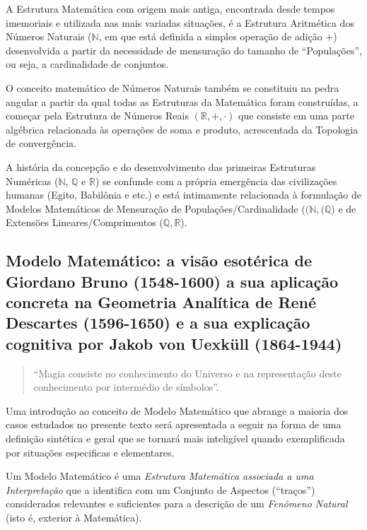     A Estrutura Matemática com origem mais antiga, encontrada desde tempos imemoriais e utilizada nas mais variadas situações, é a Estrutura Aritmética dos Números Naturais (\(\mathbb{N}\), em que está definida a simples operação de adição \(+\)) desenvolvida a partir da necessidade de mensuração do tamanho de ``Populações'', ou seja, a cardinalidade de conjuntos.
    
    O conceito matemático de Números Naturais também se constituiu na pedra angular a partir da qual todas as Estruturas da Matemática foram construídas, a começar pela Estrutura de Números Reais \((\mathbb{R}, +, \cdot)\) que consiste em uma parte algébrica relacionada às operações de soma e produto, acrescentada da Topologia de convergência.
    
    A história da concepção e do desenvolvimento das primeiras Estruturas Numéricas (\(\mathbb{N}\), \(\mathbb{Q}\) e \(\mathbb{R}\)) se confunde com a própria emergência das civilizações humanas (Egito, Babilônia e etc.) e está intimamente relacionada à formulação de Modelos Matemáticos de Mensuração de Populações/Cardinalidade (\((\mathbb{N}, (\mathbb{Q}\)) e de Extensões Lineares/Comprimentos (\(\mathbb{Q}, \mathbb{R}\)).

\subsection{Modelo Matemático: a visão esotérica de Giordano Bru\-no (1548-1600) a sua aplicação concreta na Geometria Analítica de René Descartes (1596-1650) e a sua explicação cognitiva por Jakob von Uexküll (1864-1944)}

\begin{quote}
    ``Magia consiste no conhecimento do Universo e na representação deste conhecimento por intermédio de símbolos''.
    
\end{quote}

    Uma introdução ao conceito de Modelo Matemático que abrange a maioria dos casos estudados no presente texto será apresentada a seguir na forma de uma definição sintética e geral que se tornará mais inteligível quando exemplificada por situações especificas e elementares.

\begin{definition}
Um Modelo Matemático é uma \textit{Estrutura Matemática associada a uma Interpretação} que a identifica com um Conjunto de Aspectos (``traços'') considerados relevantes e suficientes para a descrição de um \textit{Fenômeno Natural} (isto é, exterior à Matemática).
\end{definition}

